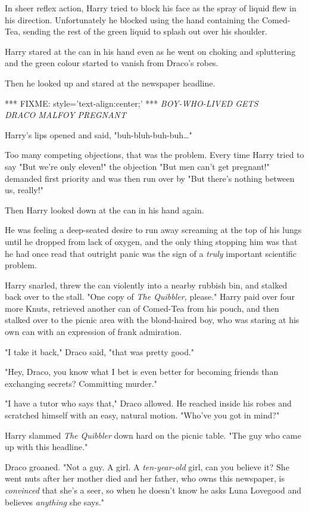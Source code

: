 In sheer reflex action, Harry tried to block his face as the spray of liquid 
flew in his direction. Unfortunately he blocked using the hand containing the 
Comed-Tea, sending the rest of the green liquid to splash out over his shoulder.

Harry stared at the can in his hand even as he went on choking and spluttering 
and the green colour started to vanish from Draco's robes.

Then he looked up and stared at the newspaper headline.

*** FIXME: style='text-align:center;' ***
\emph{BOY-WHO-LIVED GETS\\
DRACO MALFOY PREGNANT}

Harry's lips opened and said, "buh-bluh-buh-buh{\ldots}"

Too many competing objections, that was the problem. Every time Harry tried to 
say "But we're only eleven!" the objection "But men can't get pregnant!" 
demanded first priority and was then run over by "But there's nothing between 
us, really!"

Then Harry looked down at the can in his hand again.

He was feeling a deep-seated desire to run away screaming at the top of his 
lungs until he dropped from lack of oxygen, and the only thing stopping him was 
that he had once read that outright panic was the sign of a \emph{truly} 
important scientific problem.

Harry snarled, threw the can violently into a nearby rubbish bin, and stalked 
back over to the stall. "One copy of \emph{The Quibbler,} please." Harry paid 
over four more Knuts, retrieved another can of Comed-Tea from his pouch, and 
then stalked over to the picnic area with the blond-haired boy, who was staring 
at his own can with an expression of frank admiration.

"I take it back," Draco said, "that was pretty good."

"Hey, Draco, you know what I bet is even better for becoming friends than 
exchanging secrets? Committing murder."

"I have a tutor who says that," Draco allowed. He reached inside his robes and 
scratched himself with an easy, natural motion. "Who've you got in mind?"

Harry slammed \emph{The Quibbler} down hard on the picnic table. "The guy who 
came up with this headline."

Draco groaned. "Not a guy. A girl. A \emph{ten-year-old} girl, can you believe 
it? She went nuts after her mother died and her father, who owns this 
newspaper, is \emph{convinced} that she's a seer, so when he doesn't know he 
asks Luna Lovegood and believes \emph{anything} she says."

